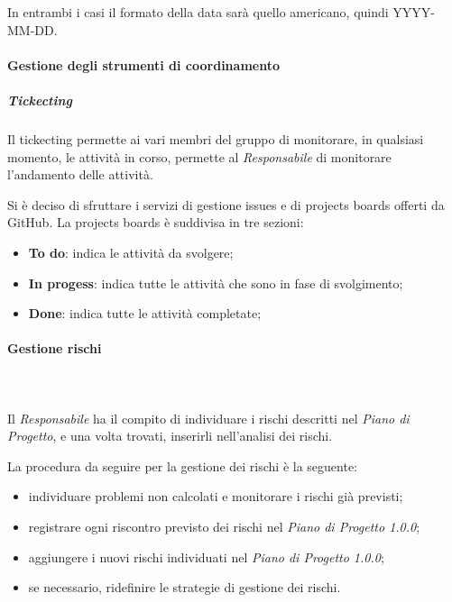    					In entrambi i casi il formato della data sarà quello americano, quindi YYYY-MM-DD.
   			\paragraph{Gestione degli strumenti di coordinamento}
   				\subparagraph{Tickecting}
   					Il tickecting permette ai vari membri del gruppo di monitorare, in qualsiasi momento, le attività in corso, permette al \textit{Responsabile} di monitorare l'andamento delle attività.
   					
   					Si è deciso di sfruttare i servizi di gestione issues e di projects boards offerti da GitHub\glos.
   					La projects boards è suddivisa in tre sezioni:
   					\begin{itemize}
   						\item \textbf{To do}: indica le attività da svolgere;
   						\item \textbf{In progess}: indica tutte le attività che sono in fase di svolgimento;
   						\item \textbf{Done}: indica tutte le attività completate;
   					\end{itemize}
   			\paragraph{Gestione rischi}\mbox{}\\ \mbox{}\\
   				Il \textit{Responsabile} ha il compito di individuare i rischi descritti nel \textit{Piano di Progetto}, e una volta trovati, inserirli nell'analisi dei rischi.
   				
   				La procedura da seguire per la gestione dei rischi è la seguente:
   				\begin{itemize}
   					\item individuare problemi non calcolati e monitorare i rischi già previsti;
   					\item registrare ogni riscontro previsto dei rischi nel \textit{Piano di Progetto 1.0.0};
   					\item aggiungere i nuovi rischi individuati nel \textit{Piano di Progetto 1.0.0};
   					\item  se necessario, ridefinire le strategie di gestione dei rischi.
   				\end{itemize}
